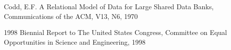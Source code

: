 \documentclass[
12pt,		%
openright,	%
twoside,  %
a4paper,			%
chapter=TITLE,		%
english,			%
french,				%
spanish,			%
brazil				%
]{USPSC-classe/USPSC}
\begin{document}
\begin{flushleft}
\begin{flushleft}
\begin{flushleft}
\begin{flushleft}
\begin{flushleft}
\begin{flushleft}
\begin{flushleft}
\begin{flushleft}
\begin{flushleft}
[CODD, 1970] Codd, E.F. A Relational Model of Data for Large Shared Data Banks, Communications of the ACM, V13, N6, 1970
\end{flushleft}


\end{flushleft}


\end{flushleft}


\end{flushleft}


\end{flushleft}


\end{flushleft}


\end{flushleft}


\end{flushleft}


\end{flushleft}


\begin{flushleft}
\begin{flushleft}
\begin{flushleft}
\begin{flushleft}
\begin{flushleft}
\begin{flushleft}
\begin{flushleft}
\begin{flushleft}
\begin{flushleft}
[CONGRESS, 1998] 1998 Biennial Report to The United States Congress, Committee on Equal Opportunities in Science and Engineering, 1998
\end{flushleft}


\end{flushleft}


\end{flushleft}


\end{flushleft}


\end{flushleft}


\end{flushleft}


\end{flushleft}


\end{flushleft}


\end{flushleft}
\end{document}
